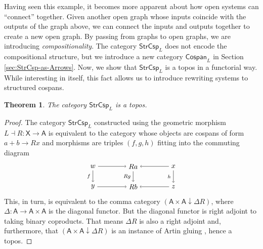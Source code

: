 \documentclass{amsart}
\newcommand{\A}{\cat{A}}
\newcommand{\X}{\cat{X}}
\newcommand{\Csp}{\cat{Cospan}}
\newcommand{\StrCsp}{\cat{StrCsp}}
\newcommand{\cat}[1]{\mathsf{#1}}
\newcommand{\from}{\colon}
\newcommand{\csp}[3]{#1 + #3 \to #2}
\newtheorem{theorem}{Theorem}[section]
\theoremstyle{remark}
\theoremstyle{definition}
\begin{document}

Having seen this example, it becomes more apparent about how open
systems can ``connect'' together. Given another open graph whose
inputs coincide with the outputs of the graph above, we can connect
the inputs and outputs together to create a new open graph. By passing
from graphs to open graphs, we are introducing
\emph{compositionality}. The category $ \StrCsp_{L} $ does not encode
the compositional structure, but we introduce a new category
$ \Csp_L $ in Section \ref{sec:StrCsp-as-Arrows}. Now, we show that
$ \StrCsp_L $ is a topos in a functorial way.  While interesting in
itself, this fact allows us to introduce rewriting systems to
structured cospans.

\begin{theorem}
\label{thm:strcsp-istopos}
  The category $ \StrCsp_L $ is a topos.
\end{theorem}

\begin{proof}
  The category $ \StrCsp_L $ constructed using the geometric morphism
  $ L \dashv R \from \X \to \A $ is equivalent to the category
  whose objects are cospans of form
  \(
    \csp{a}{Rx}{b}
  \)
  and morphisms are triples $ ( f,g,h ) $ fitting into the commuting
  diagram
  \[
    \begin{tikzpicture}
      \node (1) at (-2,1) {\( w \)};
      \node (2) at (0,1) {\( Ra \)};
      \node (3) at (2,1) {\( x \)};
      \node (4) at (-2,0) {\( y \)};
      \node (5) at (0,0) {\( Rb \)};
      \node (6) at (2,0) {\( z \)};
      \draw [->] (1) to  node [] {\scriptsize{\(  \)}} (2);
      \draw [->] (3) to node [] {\scriptsize{\(  \)}} (2);
      \draw [->] (4) to node [] {\scriptsize{\(  \)}} (5);
      \draw [->] (6) to node [] {\scriptsize{\(  \)}} (5);
      \draw [->] (1) to node [left] {\scriptsize{\( f \)}} (4);
      \draw [->] (2) to node [left] {\scriptsize{\( Rg \)}} (5);
      \draw [->] (3) to node [left] {\scriptsize{\( h \)}} (6); 
    \end{tikzpicture}
  \]
  This, in turn, is equivalent to the comma category
  $ ( \A \times \A \downarrow \Delta R ) $, where
  $ \Delta \from \A \to \A \times \A $ is the diagonal functor. But
  the diagonal functor is right adjoint to taking binary
  coproducts. That means $ \Delta R $ is also a right adjoint and,
  furthermore, that $ ( \A \times \A \downarrow \Delta R ) $ is an
  instance of Artin gluing \cite{Wraith_ArtinGlue}, hence a topos.
\end{proof}
\end{document}
